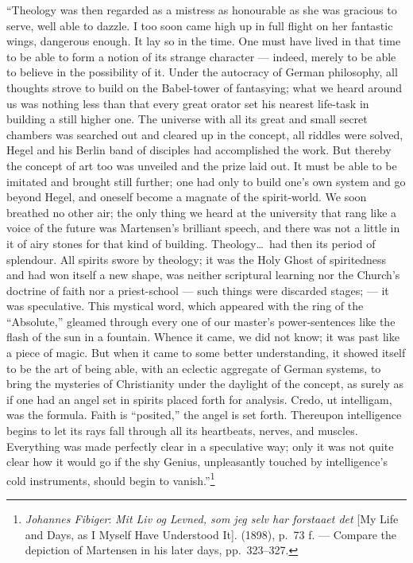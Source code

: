 \documentclass[12pt,a4paper]{book}
\newcommand{\opage}[1]{\marginnote{\footnotesize\textit{[#1]}}}
\begin{document}
``Theology was then regarded as a mistress as honourable as she was gracious to serve, well able to
dazzle. I too soon came high up in full flight on her fantastic wings, dangerous enough. It lay so
in the time. One must have lived in that time to be able to form a notion of its strange character
--- indeed, merely to be able to believe in the possibility of it. Under the autocracy of German
philosophy, all thoughts strove to build on the Babel-tower of fantasying; what we heard around us
was nothing less than that every great orator set his nearest life-task in building a still higher
one. The universe with all its great and small secret chambers was searched out and cleared up in
the concept, all riddles were solved, Hegel and his Berlin band of disciples had accomplished the
work. But thereby the concept of art too was unveiled and the prize laid out. It must be able to be
imitated and brought still further; one had only to build one's own system and go beyond Hegel, and
oneself become a magnate of the spirit-world. We soon breathed no other air; the only thing \opage{143}we
heard at the university that rang like a voice of the future was Martensen's brilliant speech, and
there was not a little in it of airy stones for that kind of building. Theology\ldots\ had then its
period of splendour. All spirits swore by theology; it was the Holy Ghost of spiritedness and had
won itself a new shape, was neither scriptural learning nor the Church's doctrine of faith nor a
priest-school --- such things were discarded stages; --- it was speculative. This mystical word,
which appeared with the ring of the ``Absolute,'' gleamed through every one of our master's
power-sentences like the flash of the sun in a fountain. Whence it came, we did not know; it was
past like a piece of magic. But when it came to some better understanding, it showed itself to be
the art of being able, with an eclectic aggregate of German systems, to bring the mysteries of
Christianity under the daylight of the concept, as surely as if one had an angel set in spirits
placed forth for analysis. Credo, ut intelligam, was the formula. Faith is ``posited,'' the angel
is set forth. Thereupon intelligence begins to let its rays fall through all its heartbeats,
nerves, and muscles. Everything was made perfectly clear in a speculative way; only it was not
quite clear how it would go if the shy Genius, unpleasantly touched by intelligence's cold
instruments, should begin to vanish.''\footnote{\emph{Johannes Fibiger}: \emph{Mit Liv og Levned, som jeg
selv har forstaaet det} [My Life and Days, as I Myself Have Understood It]. (1898), p.~73 f. ---
Compare the depiction of Martensen in his later days, pp.~323--327.}
\end{document}
